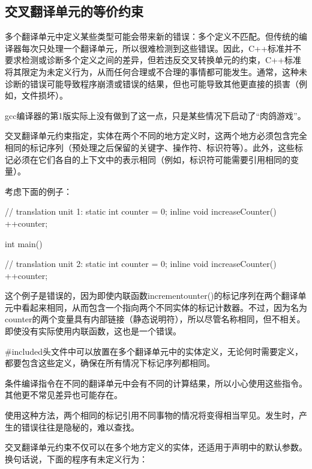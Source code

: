 \subsection{交叉翻译单元的等价约束}

多个翻译单元中定义某些类型可能会带来新的错误：多个定义不匹配。但传统的编译器每次只处理一个翻译单元，所以很难检测到这些错误。因此，C++标准并不要求检测或诊断多个定义之间的差异，但若违反交叉转换单元的约束，C++标准将其限定为未定义行为，从而任何合理或不合理的事情都可能发生。通常，这种未诊断的错误可能导致程序崩溃或错误的结果，但也可能导致其他更直接的损害（例如，文件损坏）。

\begin{notice}
gcc编译器的第1版实际上没有做到了这一点，只是某些情况下启动了“肉鸽游戏”。
\end{notice}

交叉翻译单元约束指定，实体在两个不同的地方定义时，这两个地方必须包含完全相同的标记序列（预处理之后保留的关键字、操作符、标识符等）。此外，这些标记必须在它们各自的上下文中的表示相同（例如，标识符可能需要引用相同的变量）。

考虑下面的例子：

\begin{cpp}
// translation unit 1:
static int counter = 0;
inline void increaseCounter() {
	++counter;
}

int main() { }

// translation unit 2:
static int counter = 0;
inline void increaseCounter() {
	++counter;
}
\end{cpp}

这个例子是错误的，因为即使内联函数incrementounter()的标记序列在两个翻译单元中看起来相同，从而包含一个指向两个不同实体的标记计数器。不过，因为名为counter的两个变量具有内部链接（静态说明符），所以尽管名称相同，但不相关。即使没有实际使用内联函数，这也是一个错误。

\#included头文件中可以放置在多个翻译单元中的实体定义，无论何时需要定义，都要包含这些定义，确保在所有情况下标记序列都相同。

\begin{notice}
条件编译指令在不同的翻译单元中会有不同的计算结果，所以小心使用这些指令。其他更不常见差异也可能存在。
\end{notice}

使用这种方法，两个相同的标记引用不同事物的情况将变得相当罕见。发生时，产生的错误往往是隐秘的，难以查找。

交叉翻译单元约束不仅可以在多个地方定义的实体，还适用于声明中的默认参数。换句话说，下面的程序有未定义行为：

